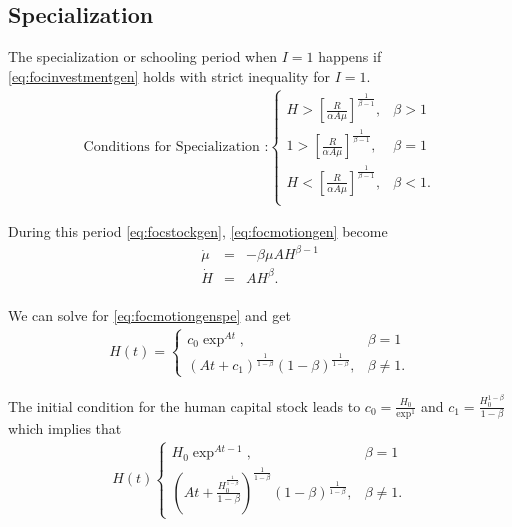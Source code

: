 \subsection{Specialization}
The specialization or schooling period when $I = 1$ happens if
\eqref{eq:focinvestmentgen} holds with strict inequality for $I=1$.
\begin{eqnarray}
\text{Conditions for Specialization :}
\begin{cases}
H > \left[ \frac{R}{\alpha A \mu} \right]^{\frac{1}{\beta - 1}}, & \beta > 1 \\
1 > \left[ \frac{R}{\alpha A \mu} \right]^{\frac{1}{\beta - 1}}, & \beta = 1 \\
H < \left[ \frac{R}{\alpha A \mu} \right]^{\frac{1}{\beta - 1}}, & \beta < 1. \\
\end{cases}
\end{eqnarray}

\noindent During this period \eqref{eq:focstockgen}, \eqref{eq:focmotiongen} become 
\begin{eqnarray}
\dot{\mu} &=& - \beta \mu A H^{\beta - 1} \label{eq:focstockgenspe} \\
\dot{H}  &=& A H^{\beta}. \label{eq:focmotiongenspe}\\
\end{eqnarray}

\indent We can solve for \eqref{eq:focmotiongenspe} and get
\begin{eqnarray}
H(t) =
\begin{cases}
c_{0} \exp^{At}, & \beta = 1 \\ 
\left( At + c_{1} \right)^{\frac{1}{1 - \beta}} (1 - \beta)^{\frac{1}{1 - \beta}}, & \beta \neq 1.

\end{cases}
\end{eqnarray}

\noindent The initial condition for the human capital stock leads to $c_{0} = \frac{H_{0}}{\exp^{1}} $ and $c_{1} = \frac{H_{0}^{1 - \beta}}{1-\beta}$ which implies that
\begin{eqnarray}
H(t)
\begin{cases}
H_{0} \exp^{At - 1}, & \beta = 1 \\
\left( At + \frac{H_{0}^{\frac{1}{1-\beta}}}{1-\beta} \right)^{\frac{1}{1 - \beta}} \left( 1 - \beta \right)^{\frac{1}{1-\beta}}, & \beta \neq 1. \label{eq:humanspe}
\end{cases}
\end{eqnarray}

